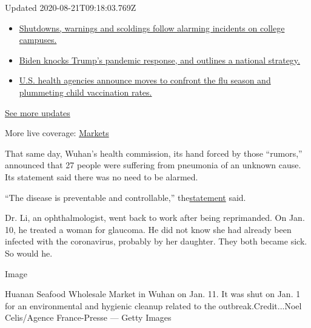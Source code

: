 Updated 2020-08-21T09:18:03.769Z

\begin{itemize}
\tightlist
\item
  \href{https://www.nytimes3xbfgragh.onion/2020/08/20/world/coronavirus-covid.html?action=click\&pgtype=Article\&state=default\&region=MAIN_CONTENT_1\&context=storylines_live_updates\#link-68774d88}{Shutdowns,
  warnings and scoldings follow alarming incidents on college campuses.}
\item
  \href{https://www.nytimes3xbfgragh.onion/2020/08/20/world/coronavirus-covid.html?action=click\&pgtype=Article\&state=default\&region=MAIN_CONTENT_1\&context=storylines_live_updates\#link-26b58724}{Biden
  knocks Trump's pandemic response, and outlines a national strategy.}
\item
  \href{https://www.nytimes3xbfgragh.onion/2020/08/20/world/coronavirus-covid.html?action=click\&pgtype=Article\&state=default\&region=MAIN_CONTENT_1\&context=storylines_live_updates\#link-4e542da3}{U.S.
  health agencies announce moves to confront the flu season and
  plummeting child vaccination rates.}
\end{itemize}

\href{https://www.nytimes3xbfgragh.onion/2020/08/20/world/coronavirus-covid.html?action=click\&pgtype=Article\&state=default\&region=MAIN_CONTENT_1\&context=storylines_live_updates}{See
more updates}

More live coverage:
\href{https://www.nytimes3xbfgragh.onion/live/2020/08/20/business/stock-market-today-coronavirus?action=click\&pgtype=Article\&state=default\&region=MAIN_CONTENT_1\&context=storylines_live_updates}{Markets}

That same day, Wuhan's health commission, its hand forced by those
``rumors,'' announced that 27 people were suffering from pneumonia of an
unknown cause. Its statement said there was no need to be alarmed.

``The disease is preventable and controllable,''
the\href{http://wjw.wuhan.gov.cn/front/web/showDetail/2019123108989}{statement}
said.

Dr. Li, an ophthalmologist, went back to work after being reprimanded.
On Jan. 10, he treated a woman for glaucoma. He did not know she had
already been infected with the coronavirus, probably by her daughter.
They both became sick. So would he.

Image

Huanan Seafood Wholesale Market in Wuhan on Jan. 11. It was shut on Jan.
1 for an environmental and hygienic cleanup related to the
outbreak.Credit...Noel Celis/Agence France-Presse --- Getty Images

